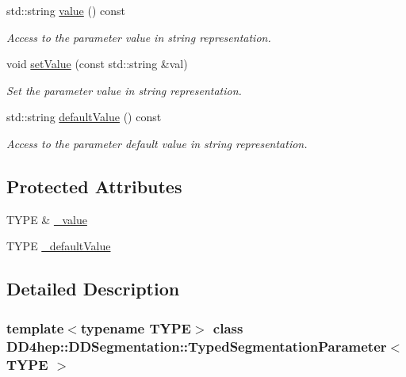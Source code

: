 \begin{DoxyCompactItemize}
std::string \hyperlink{class_d_d4hep_1_1_d_d_segmentation_1_1_typed_segmentation_parameter_a71988bceae6a646bf38ca704d35f9de3}{value} () const 
\begin{DoxyCompactList}\small\item\em Access to the parameter value in string representation. \item\end{DoxyCompactList}\item 
void \hyperlink{class_d_d4hep_1_1_d_d_segmentation_1_1_typed_segmentation_parameter_a32e4b30c056572c1892b0607d05774e2}{setValue} (const std::string \&val)
\begin{DoxyCompactList}\small\item\em Set the parameter value in string representation. \item\end{DoxyCompactList}\item 
std::string \hyperlink{class_d_d4hep_1_1_d_d_segmentation_1_1_typed_segmentation_parameter_ad3c9449bad6d6516505d1677e548f251}{defaultValue} () const 
\begin{DoxyCompactList}\small\item\em Access to the parameter default value in string representation. \item\end{DoxyCompactList}\end{DoxyCompactItemize}
\subsection*{Protected Attributes}
\begin{DoxyCompactItemize}
\item 
TYPE \& \hyperlink{class_d_d4hep_1_1_d_d_segmentation_1_1_typed_segmentation_parameter_af22eb54e9ee1571cf874c2c05c641603}{\_\-value}
\item 
TYPE \hyperlink{class_d_d4hep_1_1_d_d_segmentation_1_1_typed_segmentation_parameter_a91a6da96caf97f4c01828b98812d3e7f}{\_\-defaultValue}
\end{DoxyCompactItemize}


\subsection{Detailed Description}
\subsubsection*{template$<$typename TYPE$>$ class DD4hep::DDSegmentation::TypedSegmentationParameter$<$ TYPE $>$}



